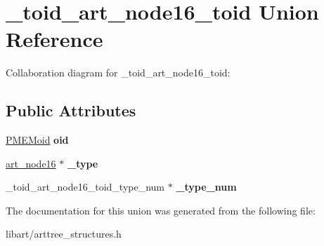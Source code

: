 \hypertarget{union__toid__art__node16__toid}{}\section{\+\_\+toid\+\_\+art\+\_\+node16\+\_\+toid Union Reference}
\label{union__toid__art__node16__toid}


Collaboration diagram for \+\_\+toid\+\_\+art\+\_\+node16\+\_\+toid\+:
\subsection*{Public Attributes}
\begin{DoxyCompactItemize}
\item 
\mbox{\label{union__toid__art__node16__toid_a72853d970e703c4a024b7de9614a9589}} 
\hyperlink{structpmemoid}{P\+M\+E\+Moid} {\bfseries oid}
\item 
\mbox{\label{union__toid__art__node16__toid_a814d7a03678b76b5213db57e0b6594a0}} 
\hyperlink{struct__art__node16}{art\+\_\+node16} $\ast$ {\bfseries \+\_\+type}
\item 
\mbox{\label{union__toid__art__node16__toid_a612bf95789db93865838ac2ac74c837b}} 
\+\_\+toid\+\_\+art\+\_\+node16\+\_\+toid\+\_\+type\+\_\+num $\ast$ {\bfseries \+\_\+type\+\_\+num}
\end{DoxyCompactItemize}


The documentation for this union was generated from the following file\+:\begin{DoxyCompactItemize}
\item 
libart/arttree\+\_\+structures.\+h\end{DoxyCompactItemize}
